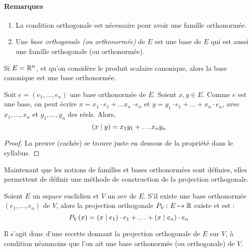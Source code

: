 \paragraph{Remarques}
\begin{enumerate}
\item La condition orthogonale est nécessaire pour avoir une famille orthonormée.
\item Une \emph{base orthogonale (ou orthonormée)} de $E$ est une base de $E$ qui est aussi une famille orthogonale (ou orthonormée).
\end{enumerate}

\begin{exemple}
Si $E=\mathbb{R}^n$, et qu'on considère le produit scalaire canonique, alors la base canonique est une base orthonormée.
\end{exemple}

\begin{propriete}
Soit $e=(e_1, \ldots, e_n)$ une base orthonormée de $E$. Soient $x, y \in E$. Comme $e$ est une base, on peut écrire $x=x_1 \cdot e_1 + \ldots x_n \cdot e_n$ et $y=y_1 \cdot e_1+\ldots + x_n \cdot e_n$, avec $x_1, \ldots, x_n$ et $y_1, \ldots, y_n$ des réels. Alors,
\[ \left( x \mid y \right) = x_1y_1 + \ldots x_ny_n \]
\end{propriete}

\begin{proof}
La preuve (cachée) se trouve juste en dessous de la propriété dans le syllabus.
\end{proof}

Maintenant que les notions de familles et bases orthonormées sont définies, elles permettent de définir une méthode de construction de la projection orthogonale.

\begin{propriete}
Soient $E$ un espace euclidien et $V$ un sev de $E$.
S'il existe une base orthonormée $(e_1, \ldots, e_n)$ de $V$, alors la projection orthogonale $P_V \colon E \mapsto \mathbb{R}$ existe et est :
\[ P_V(x) = \left( x \mid e_1 \right) \cdot e_1 + \ldots + \left( x \mid e_n \right) \cdot e_n \]
\end{propriete}

Il s'agit donc d'une recette donnant la projection orthogonale de $E$ sur $V$, à condition néanmoins que l'on ait une base orthonormée (ou orthogonale) de $V$.

